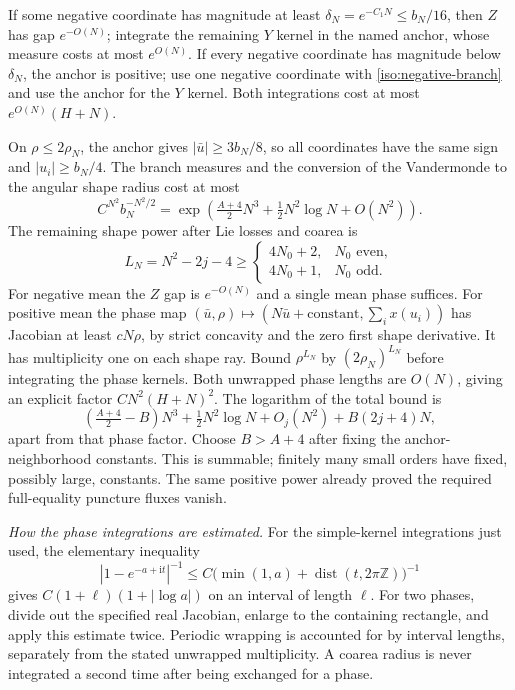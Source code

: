 \documentclass[11pt]{article}
\numberwithin{equation}{section}
\theoremstyle{definition}
\newcommand{\Z}{\mathbb Z}
\newcommand{\ii}{\mathrm i}
\DeclareMathOperator{\dist}{dist}
\begin{document}
If some negative coordinate has magnitude at least
$\delta_N=e^{-C_1N}\le b_N/16$, then $Z$ has gap $e^{-O(N)}$;
integrate the remaining $Y$ kernel in the named anchor, whose measure
costs at most $e^{O(N)}$. If every negative coordinate has magnitude
below $\delta_N$, the anchor is positive; use one negative coordinate
with \eqref{iso:negative-branch} and use the anchor for the $Y$ kernel.
Both integrations cost at most $e^{O(N)}(H+N)$.

On $\rho\le2\rho_N$, the anchor gives
$|\bar u|\ge3b_N/8$, so all coordinates have the same sign and
$|u_i|\ge b_N/4$. The branch measures and the conversion of the
Vandermonde to the angular shape radius cost at most
\[
 C^{N^2}b_N^{-N^2/2}
 =\exp\left(\tfrac{A+4}{2}N^3+\tfrac12N^2\log N+O(N^2)\right).
\]
The remaining shape power after Lie losses and coarea is
\[
 L_N=N^2-2j-4\ge
 \begin{cases}4N_0+2,&N_0\text{ even},\\4N_0+1,&N_0\text{ odd}.
 \end{cases}
\]
For negative mean the $Z$ gap is $e^{-O(N)}$ and a single mean phase
suffices. For positive mean the phase map
$(\bar u,\rho)\mapsto(N\bar u+\text{constant},\sum_i x(u_i))$
has Jacobian at least $cN\rho$, by strict concavity and the zero first
shape derivative. It has multiplicity one on each shape ray.
Bound $\rho^{L_N}$ by $(2\rho_N)^{L_N}$ before integrating the
phase kernels. Both unwrapped phase lengths are $O(N)$, giving an
explicit factor $CN^2(H+N)^2$. The logarithm of the total bound is
\[
 \left(\tfrac{A+4}{2}-B\right)N^3+\tfrac12N^2\log N
 +O_j(N^2)+B(2j+4)N,
\]
apart from that phase factor. Choose $B>A+4$ after fixing the
anchor-neighborhood constants. This is summable; finitely many small
orders have fixed, possibly large, constants. The same positive power
already proved the required full-equality puncture fluxes vanish.

\emph{How the phase integrations are estimated.}
For the simple-kernel integrations just used, the elementary inequality
\[
 |1-e^{-a+\ii t}|^{-1}
 \le C\bigl(\min(1,a)+\dist(t,2\pi\Z)\bigr)^{-1}
\]
gives $C(1+\ell)(1+|\log a|)$ on an interval of length $\ell$.
For two phases, divide out the specified real Jacobian, enlarge to the
containing rectangle, and apply this estimate twice. Periodic wrapping
is accounted for by interval lengths, separately from the stated
unwrapped multiplicity. A coarea radius is never integrated a second
time after being exchanged for a phase.
\end{document}
